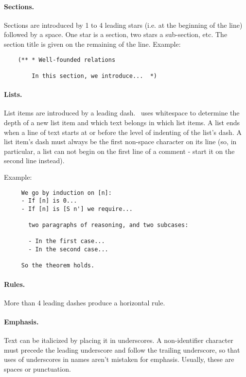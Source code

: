 \paragraph{Sections.}
Sections are introduced by 1 to 4 leading stars (i.e. at the beginning of the
line) followed by a space. One star is a section, two stars a sub-section, etc.
The section title is given on the remaining of the line.
Example:
\begin{verbatim}
    (** * Well-founded relations

        In this section, we introduce...  *)
\end{verbatim}




\paragraph{Lists.}
List items are introduced by a leading dash.  \coqdoc\ uses whitespace
to determine the depth of a new list item and which text belongs in
which list items.  A list ends when a line of text starts at or before
the level of indenting of the list's dash.  A list item's dash must
always be the first non-space character on its line (so, in
particular, a list can not begin on the first line of a comment -
start it on the second line instead).

Example:
\begin{verbatim}
     We go by induction on [n]:
     - If [n] is 0...
     - If [n] is [S n'] we require...

       two paragraphs of reasoning, and two subcases:

       - In the first case...
       - In the second case...

     So the theorem holds.
\end{verbatim}

\paragraph{Rules.}
More than 4 leading dashes produce a horizontal rule.

\paragraph{Emphasis.}
Text can be italicized by placing it in underscores.  A non-identifier
character must precede the leading underscore and follow the trailing
underscore, so that uses of underscores in names aren't mistaken for
emphasis.  Usually, these are spaces or punctuation.

